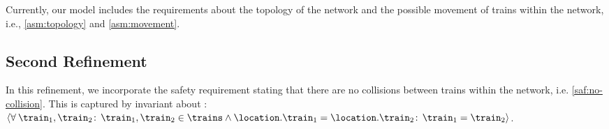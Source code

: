 
Currently, our model includes the requirements about the topology
of the network and the possible movement of trains within the network,
i.e., \ref{asm:topology} and \ref{asm:movement}.

\subsection{Second Refinement}
\label{sec:second-refinement}
In this refinement, we incorporate the safety requirement stating that
there are no collisions between trains within the network,
i.e. \ref{saf:no-collision}.  This is captured by invariant
 about \location: $\qforall{\train_1,\train_2}{\train_1, \train_2 \in \trains \land \location.\train_1 =
  \location.\train_2}{\train_1 = \train_2}$.

